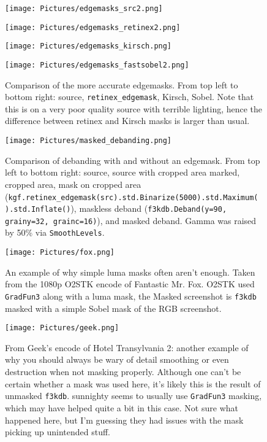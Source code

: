 \documentclass{scrartcl}
\begin{document}
\begin{figure}[h]
\begin{minipage}{.5\textwidth}
\centering
\texttt{[image: Pictures/edgemasks\_src2.png]}
\end{minipage}
\begin{minipage}{.5\textwidth}
\centering
\texttt{[image: Pictures/edgemasks\_retinex2.png]}
\end{minipage}
\begin{minipage}{.5\textwidth}
\centering
\texttt{[image: Pictures/edgemasks\_kirsch.png]}
\end{minipage}
\begin{minipage}{.5\textwidth}
\centering
\texttt{[image: Pictures/edgemasks\_fastsobel2.png]}
\end{minipage}
\caption{Comparison of the more accurate edgemasks.  From top left to bottom right: source, \texttt{retinex\_edgemask}, Kirsch, Sobel.  Note that this is on a very poor quality source with terrible lighting, hence the difference between retinex and Kirsch masks is larger than usual.}\label{fig:23}
\end{figure}

\begin{figure}[h]
\centering
\texttt{[image: Pictures/masked\_debanding.png]}
\caption{Comparison of debanding with and without an edgemask.  From top left to bottom right: source, source with cropped area marked, cropped area, mask on cropped area (\texttt{kgf.retinex\_edgemask(src).std.Binarize(5000).std.Maximum( ).std.Inflate()}), maskless deband (\texttt{f3kdb.Deband(y=90, grainy=32, grainc=16)}), and masked deband.  Gamma was raised by 50\% via \texttt{SmoothLevels}.}\label{fig:18}
\end{figure}

\begin{figure}[h]
\centering
\texttt{[image: Pictures/fox.png]}
\caption{An example of why simple luma masks often aren't enough.  Taken from the 1080p O2STK encode of Fantastic Mr. Fox.  O2STK used \texttt{GradFun3} along with a luma mask, the Masked screenshot is \texttt{f3kdb} masked with a simple Sobel mask of the RGB screenshot.}
\label{fig:19}
\end{figure}

\begin{figure}[h]
\centering
\texttt{[image: Pictures/geek.png]}
\caption{From Geek's encode of Hotel Transylvania 2: another example of why you should always be wary of detail smoothing or even destruction when not masking properly.  Although one can't be certain whether a mask was used here, it's likely this is the result of unmasked \texttt{f3kdb}.  \tiny{sunnighty seems to usually use \texttt{GradFun3} masking, which may have helped quite a bit in this case.  Not sure what happened here, but I'm guessing they had issues with the mask picking up unintended stuff.}}\label{fig:24}
\end{figure}
\end{document}
